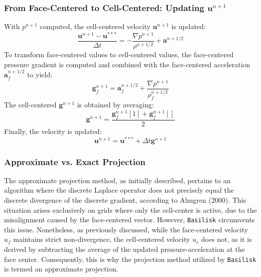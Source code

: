 \documentclass[a4paper]{article}
\newcommand{\para}[1]{\textbf{\emph{\textcolor{para}{#1}}}}
\begin{document}
\subsubsection{From Face-Centered to Cell-Centered: Updating $\mathbf{u}^{n+1}$}  

With $p^{n+1}$ computed, the cell-centered velocity $\mathbf{u}^{n+1}$ is updated:  
\begin{equation}
    \frac{\mathbf{u}^{n+1} - \mathbf{u}^{***}}{\Delta t} = -\frac{\nabla
    p^{n+1}}{\rho^{n+1/2}} + \mathbf{a}^{n+1/2}
\end{equation}  
To transform face-centered values to cell-centered values, the face-centered pressure gradient is computed and combined with the face-centered acceleration $\mathbf{a}_f^{n+1/2}$ to yield:  
\begin{equation}
    \mathbf{g}_f^{n+1} = \mathbf{a}_f^{n+1/2} + \frac{\nabla p^{n+1}}{\rho_f^{n+1/2}}
\end{equation}  
The cell-centered $\mathbf{g}^{n+1}$ is obtained by averaging:  
\begin{equation}
    \mathbf{g}^{n+1} = \frac{\mathbf{g}_f^{n+1}[1] + \mathbf{g}_f^{n+1}[]}{2}
\end{equation}  
Finally, the velocity is updated:  
\begin{equation}
    \mathbf{u}^{n+1} = \mathbf{u}^{***} + \Delta t \mathbf{g}^{n+1}
\end{equation}  

\subsubsection{Approximate vs. Exact Projection}  
The approximate projection method, as initially described, pertains to an algorithm where the discrete Laplace operator does not precisely equal the discrete divergence of the discrete gradient, according to Almgren (2000)\cite{2000_Almgren}. This situation arises exclusively on grids where only the cell-center is active, due to the misalignment caused by the face-centered vector. However, \texttt{Basilisk} circumvents this issue. Nonetheless, as previously discussed, while the face-centered velocity \para{$u_f$} maintains strict non-divergence, the cell-centered velocity \para{$u_c$} does not, as it is derived by subtracting the average of the updated pressure-acceleration at the face center. Consequently, this is why the projection method utilized by \texttt{Basilisk} is termed an approximate projection.

\printbibliography
\end{document}
